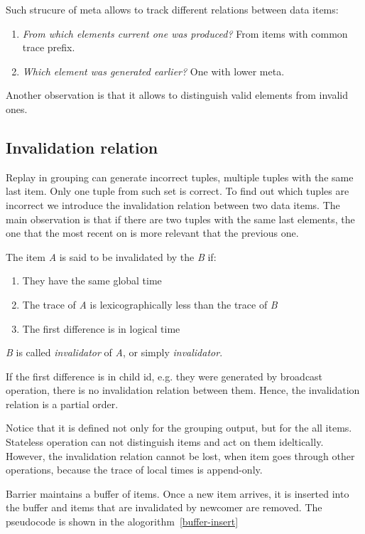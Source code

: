 Such strucure of meta allows to track different relations between data items:

\begin{enumerate}
  \item{{\it From which elements current one was produced?} From items with common trace prefix.}
  \item{{\it Which element was generated earlier?} One with lower meta.}
\end{enumerate}

Another observation is that it allows to distinguish valid elements from invalid ones.

\subsection{Invalidation relation}

Replay in grouping can generate incorrect tuples, multiple tuples with the same last item. Only one tuple from such set is correct. To find out which tuples are incorrect we introduce the invalidation relation between two data items. The main observation is that if there are two tuples with the same last elements, the one that the most recent on is more relevant that the previous one. 

The item {\it A} is said to be invalidated by the {\it B} if:

\begin{enumerate}
\item They have the same global time
\item The trace of {\it A} is lexicographically less than the trace of {\it B}
\item The first difference is in logical time
\end{enumerate}

{\it B} is called {\it invalidator} of {\it A}, or simply {\it invalidator}.

If the first difference is in child id, e.g. they were generated by broadcast operation, there is no invalidation relation between them. Hence, the invalidation relation is a partial order. 

Notice that it is defined not only for the grouping output, but for the all items. Stateless operation can not distinguish items and act on them ideltically. However, the invalidation relation cannot be lost, when item goes through other operations, because the trace of local times is append-only.

Barrier maintains a buffer of items. Once a new item arrives, it is inserted into the buffer and items that are invalidated by newcomer are removed. The pseudocode is shown in the alogorithm~\ref{buffer-insert}

